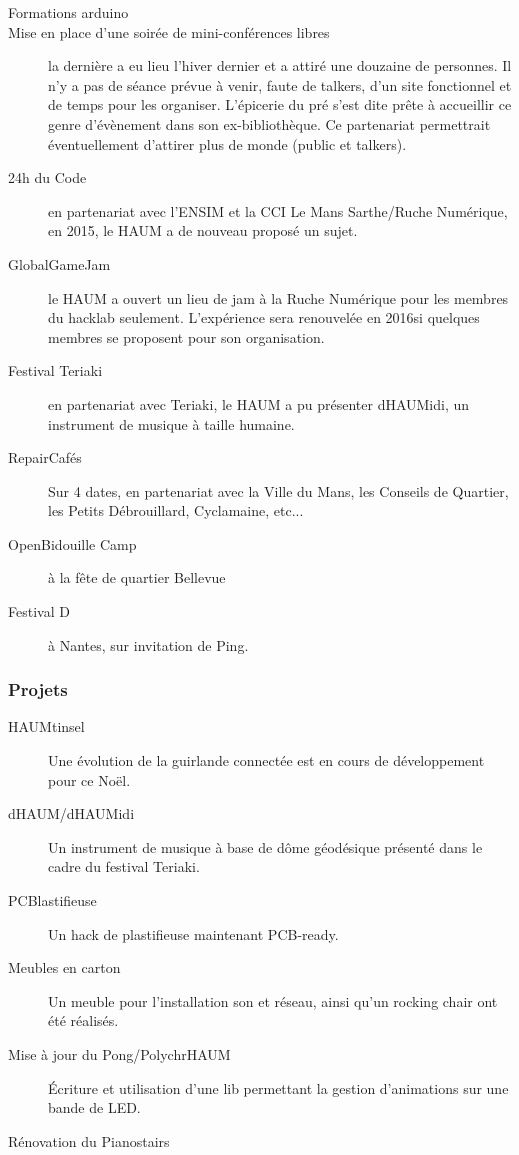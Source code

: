 \documentclass[11pt]{article}
\begin{document}
\begin{description}
    \item[Formations arduino]
    \item[Mise en place d'une soirée de mini-conférences libres] la dernière a eu lieu l'hiver dernier et a attiré une
		douzaine de personnes. Il n'y a pas de séance prévue à venir, faute de talkers, d'un site fonctionnel et de
		temps pour les organiser. L'épicerie du pré s'est dite prête à accueillir ce genre d'évènement dans son ex-bibliothèque. Ce partenariat permettrait éventuellement d'attirer plus de monde (public et talkers).
    \item[24h du Code] en partenariat avec l'ENSIM et la CCI Le Mans Sarthe/Ruche Numérique, en 2015, le HAUM a de nouveau proposé un sujet.
	\item[GlobalGameJam] le HAUM a ouvert un lieu de jam à la Ruche Numérique pour les membres du hacklab seulement. L'expérience sera renouvelée en 2016si quelques membres se proposent pour son organisation.
    \item[Festival Teriaki] en partenariat avec Teriaki, le HAUM a pu présenter dHAUMidi, un instrument de musique à taille humaine.
	\item[RepairCafés] Sur 4 dates, en partenariat avec la Ville du Mans, les Conseils de Quartier, les Petits
		Débrouillard, Cyclamaine, etc...
	\item[OpenBidouille Camp] à la fête de quartier Bellevue
	\item[Festival D] à Nantes, sur invitation de Ping.
\end{description}

\subsubsection{Projets}
\label{ssec:projects}

\begin{description}
	\item[HAUMtinsel] Une évolution de la guirlande connectée est en cours de développement pour ce Noël.
	\item[dHAUM/dHAUMidi] Un instrument de musique à base de dôme géodésique présenté dans le cadre du festival Teriaki.
	\item[PCBlastifieuse] Un hack de plastifieuse maintenant PCB-ready.
	\item[Meubles en carton] Un meuble pour l'installation son et réseau, ainsi qu'un rocking chair ont été réalisés.
	\item[Mise à jour du Pong/PolychrHAUM] Écriture et utilisation d'une lib permettant la gestion d'animations sur une bande de LED.
	\item[Rénovation du Pianostairs]
\end{description}
\end{document}
